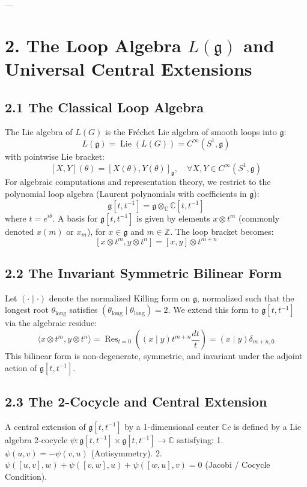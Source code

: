 \documentclass[11pt,twoside,openright]{amsbook}
\begin{document}
---

\section{2. The Loop Algebra $L(\mathfrak{g})$ and Universal Central Extensions}

\subsection{2.1 The Classical Loop Algebra}
The Lie algebra of $L(G)$ is the Fréchet Lie algebra of smooth loops into $\mathfrak{g}$:
$$L(\mathfrak{g}) = \operatorname{Lie}(L(G)) = C^\infty(S^1, \mathfrak{g})$$
with pointwise Lie bracket:
$$[X, Y](\theta) = [X(\theta), Y(\theta)]_{\mathfrak{g}}, \quad \forall X, Y \in C^\infty(S^1, \mathfrak{g})$$
For algebraic computations and representation theory, we restrict to the polynomial loop algebra (Laurent polynomials with coefficients in $\mathfrak{g}$):
$$\mathfrak{g}[t, t^{-1}] = \mathfrak{g} \otimes_{\mathbb{C}} \mathbb{C}[t, t^{-1}]$$
where $t = e^{i\theta}$. A basis for $\mathfrak{g}[t, t^{-1}]$ is given by elements $x \otimes t^m$ (commonly denoted $x(m)$ or $x_m$), for $x \in \mathfrak{g}$ and $m \in \mathbb{Z}$. The loop bracket becomes:
$$[x \otimes t^m, y \otimes t^n] = [x, y] \otimes t^{m+n}$$

\subsection{2.2 The Invariant Symmetric Bilinear Form}
Let $(\cdot \mid \cdot)$ denote the normalized Killing form on $\mathfrak{g}$, normalized such that the longest root $\theta_{\mathrm{long}}$ satisfies $(\theta_{\mathrm{long}} \mid \theta_{\mathrm{long}}) = 2$. We extend this form to $\mathfrak{g}[t, t^{-1}]$ via the algebraic residue:
$$\langle x \otimes t^m, y \otimes t^n \rangle = \operatorname{Res}_{t=0} \left( (x \mid y) t^{m+n} \frac{dt}{t} \right) = (x \mid y) \delta_{m+n, 0}$$
This bilinear form is non-degenerate, symmetric, and invariant under the adjoint action of $\mathfrak{g}[t, t^{-1}]$.

\subsection{2.3 The 2-Cocycle and Central Extension}
A central extension of $\mathfrak{g}[t, t^{-1}]$ by a 1-dimensional center $\mathbb{C} c$ is defined by a Lie algebra 2-cocycle $\psi: \mathfrak{g}[t, t^{-1}] \times \mathfrak{g}[t, t^{-1}] \to \mathbb{C}$ satisfying:
1. $\psi(u, v) = -\psi(v, u)$ (Antisymmetry).
2. $\psi([u, v], w) + \psi([v, w], u) + \psi([w, u], v) = 0$ (Jacobi / Cocycle Condition).
\end{document}
